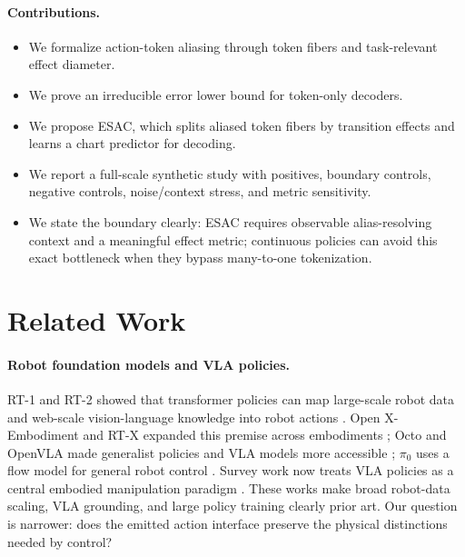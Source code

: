 \documentclass{article}
\begin{document}
\paragraph{Contributions.}
\begin{itemize}[leftmargin=1.4em]
    \item We formalize action-token aliasing through token fibers and
    task-relevant effect diameter.
    \item We prove an irreducible error lower bound for token-only decoders.
    \item We propose ESAC, which splits aliased token fibers by transition
    effects and learns a chart predictor for decoding.
    \item We report a full-scale synthetic study with positives, boundary
    controls, negative controls, noise/context stress, and metric sensitivity.
    \item We state the boundary clearly: ESAC requires observable
    alias-resolving context and a meaningful effect metric; continuous policies
    can avoid this exact bottleneck when they bypass many-to-one tokenization.
\end{itemize}

\section{Related Work}

\paragraph{Robot foundation models and VLA policies.}
RT-1 and RT-2 showed that transformer policies can map large-scale robot data
and web-scale vision-language knowledge into robot actions
\citep{brohan2023rt1,brohan2023rt2}. Open X-Embodiment and RT-X expanded this
premise across embodiments \citep{openx2023rtx}; Octo and OpenVLA made
generalist policies and VLA models more accessible
\citep{octo2024,kim2024openvla}; $\pi_0$ uses a flow model for general robot
control \citep{black2024pi0}. Survey work now treats VLA policies as a central
embodied manipulation paradigm \citep{li2025surveyvla,din2025systematic}. These
works make broad robot-data scaling, VLA grounding, and large policy training
clearly prior art. Our question is narrower: does the emitted action interface
preserve the physical distinctions needed by control?
\end{document}
